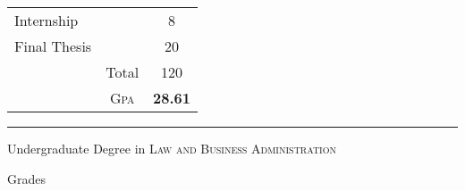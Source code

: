 \documentclass[a4paper,10pt]{article}
\begin{document}
\begin{center}
\begin{tabular}{lcc}
    Internship                                      &                & 8                   \\

    Final Thesis                                    &                & 20                  \\

                                                    & Total          & 120                 \\\cline{2-3}
                                                    & \textsc{Gpa}   & \textbf{28.61}
  \end{tabular}
\end{center}
\bigskip
\hrule
\bigskip
\par{\centering\Large \hypertarget{grds_cleli}{Undergraduate Degree in \textsc{Law and Business Administration}}\par}\large{\centering Grades\par}\normalsize
\end{document}
